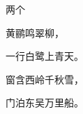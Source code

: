 \begin{minipage}[c][2.5cm][t]{2em} 两个 \end{minipage}\quad
\begin{minipage}[c][2.5cm][c]{3em} 黄鹂鸣翠柳， \end{minipage}\quad
\begin{minipage}[c][2.5cm][b]{3em} 一行白鹭上青天。 \end{minipage}\quad
\begin{minipage}[c][2.5cm][s]{4em}
\setlength{\parskip}{0pt plus 1pt}%
窗含西岭千秋雪，\par
门泊东吴万里船。
\end{minipage}
